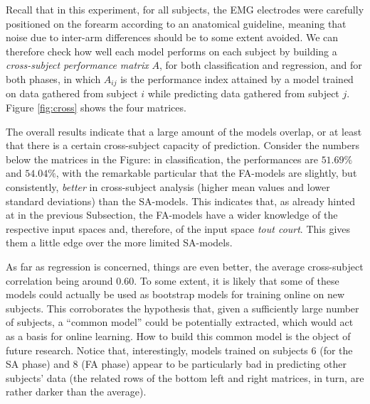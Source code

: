 \documentclass[10pt]{bmc_article}
\def\texttt{[image: ]}
\newenvironment{bmcformat}{\begin{raggedright}\baselineskip20pt\sloppy\setboolean{publ}{false}}{\end{raggedright}\baselineskip20pt\sloppy}
\begin{document}
\begin{bmcformat}
Recall that in this experiment, for all subjects, the EMG electrodes
were carefully positioned on the forearm according to an anatomical
guideline, meaning that noise due to inter-arm differences should be
to some extent avoided. We can therefore check how well each model
performs on each subject by building a \emph{cross-subject performance
matrix} $A$, for both classification and regression, and for both phases,
in which $A_{ij}$ is the performance index attained by a model trained
on data gathered from subject $i$ while predicting data gathered from
subject $j$. Figure \ref{fig:cross} shows the four matrices.


The overall results indicate that a large amount of the models
overlap, or at least that there is a certain cross-subject capacity of
prediction. Consider the numbers below the matrices in the Figure: in
classification, the performances are $51.69\%$ and $54.04\%$, with the
remarkable particular that the FA-models are slightly, but
consistently, \emph{better} in cross-subject analysis (higher mean
values and lower standard deviations) than the SA-models. This
indicates that, as already hinted at in the previous Subsection, the
FA-models have a wider knowledge of the respective input spaces and,
therefore, of the input space \emph{tout court}. This gives them a
little edge over the more limited SA-models.

As far as regression is concerned, things are even better, the average
cross-subject correlation being around $0.60$. To some extent, it is
likely that some of these models could actually be used as bootstrap
models for training online on new subjects. This corroborates the
hypothesis that, given a sufficiently large number of subjects, a
``common model'' could be potentially extracted, which would act as a
basis for online learning. How to build this common model is the
object of future research. Notice that, interestingly, models trained
on subjects $6$ (for the SA phase) and $8$ (FA phase) appear to be
particularly bad in predicting other subjects' data (the related rows
of the bottom left and right matrices, in turn, are rather darker than
the average).


\end{bmcformat}
\end{document}
